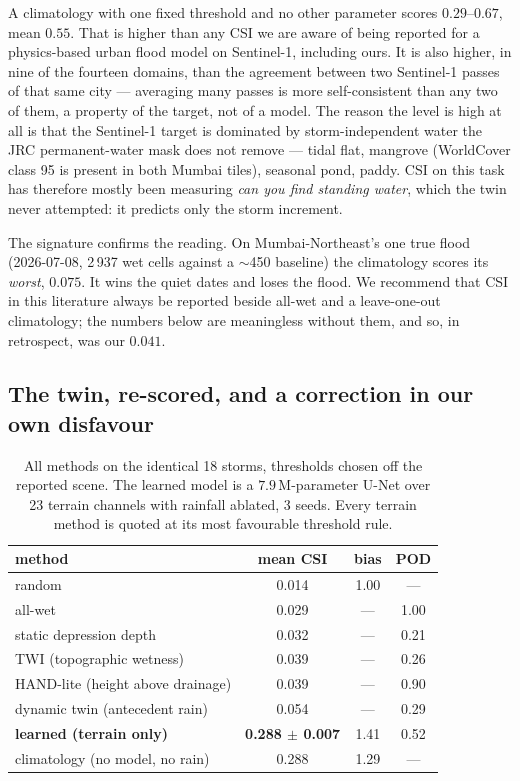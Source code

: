 \documentclass[10pt]{article}
\begin{document}
A climatology with one fixed threshold and no other parameter scores $0.29$--$0.67$, mean
$0.55$. That is higher than any CSI we are aware of being reported for a physics-based urban
flood model on Sentinel-1, including ours. It is also higher, in nine of the fourteen domains,
than the agreement between two Sentinel-1 passes of that same city --- averaging many passes
is more self-consistent than any two of them, a property of the target, not of a model.
The reason the level is high at all is
that the Sentinel-1 target is dominated by storm-independent water the JRC permanent-water mask
does not remove --- tidal flat, mangrove (WorldCover class 95 is present in both Mumbai tiles),
seasonal pond, paddy. CSI on this task has therefore mostly been measuring \emph{can you find
standing water}, which the twin never attempted: it predicts only the storm increment.

The signature confirms the reading. On Mumbai-Northeast's one true flood (2026-07-08, 2\,937 wet
cells against a $\sim$450 baseline) the climatology scores its \emph{worst}, $0.075$. It wins the
quiet dates and loses the flood. We recommend that CSI in this literature always be reported
beside all-wet and a leave-one-out climatology; the numbers below are meaningless without them,
and so, in retrospect, was our $0.041$.

\subsection{The twin, re-scored, and a correction in our own disfavour}
\begin{table}[t]
\centering\small
\caption{All methods on the identical 18 storms, thresholds chosen off the reported scene.
The learned model is a $7.9$\,M-parameter U-Net over 23 terrain channels with rainfall ablated,
3 seeds. Every terrain method is quoted at its most favourable threshold rule.}
\label{tab:baselines}
\begin{tabular}{lccc}
\toprule
method & mean CSI & bias & POD \\
\midrule
random                            & 0.014 & 1.00 & --- \\
all-wet                           & 0.029 & --- & 1.00 \\
static depression depth           & 0.032 & --- & 0.21 \\
TWI (topographic wetness)         & 0.039 & --- & 0.26 \\
HAND-lite (height above drainage) & 0.039 & --- & 0.90 \\
dynamic twin (antecedent rain)    & 0.054 & --- & 0.29 \\
\midrule
\textbf{learned (terrain only)}   & \textbf{0.288 $\pm$ 0.007} & 1.41 & 0.52 \\
climatology (no model, no rain)   & 0.288 & 1.29 & --- \\
\bottomrule
\end{tabular}
\end{table}
\end{document}
